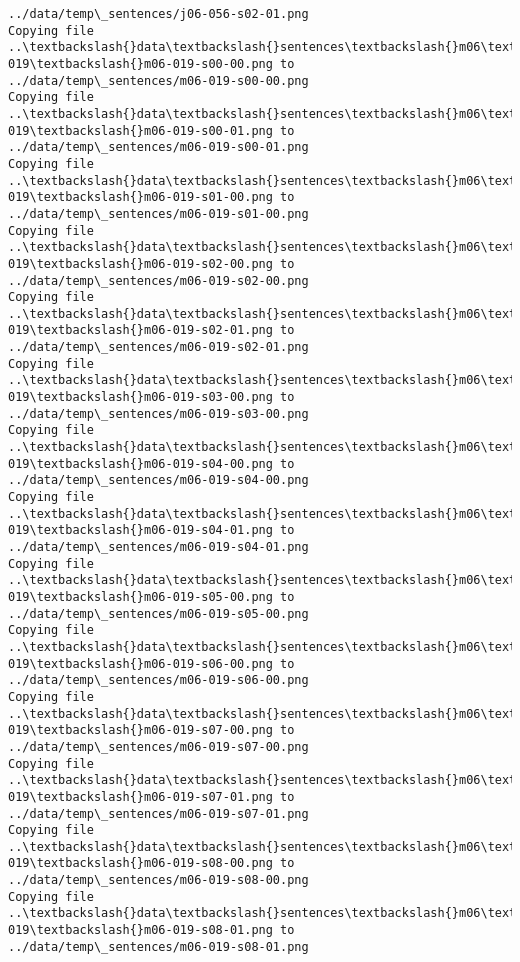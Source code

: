 \documentclass[11pt]{article}
\begin{document}
\begin{Verbatim}[commandchars=\\\{\}]
../data/temp\_sentences/j06-056-s02-01.png
Copying file ..\textbackslash{}data\textbackslash{}sentences\textbackslash{}m06\textbackslash{}m06-019\textbackslash{}m06-019-s00-00.png to
../data/temp\_sentences/m06-019-s00-00.png
Copying file ..\textbackslash{}data\textbackslash{}sentences\textbackslash{}m06\textbackslash{}m06-019\textbackslash{}m06-019-s00-01.png to
../data/temp\_sentences/m06-019-s00-01.png
Copying file ..\textbackslash{}data\textbackslash{}sentences\textbackslash{}m06\textbackslash{}m06-019\textbackslash{}m06-019-s01-00.png to
../data/temp\_sentences/m06-019-s01-00.png
Copying file ..\textbackslash{}data\textbackslash{}sentences\textbackslash{}m06\textbackslash{}m06-019\textbackslash{}m06-019-s02-00.png to
../data/temp\_sentences/m06-019-s02-00.png
Copying file ..\textbackslash{}data\textbackslash{}sentences\textbackslash{}m06\textbackslash{}m06-019\textbackslash{}m06-019-s02-01.png to
../data/temp\_sentences/m06-019-s02-01.png
Copying file ..\textbackslash{}data\textbackslash{}sentences\textbackslash{}m06\textbackslash{}m06-019\textbackslash{}m06-019-s03-00.png to
../data/temp\_sentences/m06-019-s03-00.png
Copying file ..\textbackslash{}data\textbackslash{}sentences\textbackslash{}m06\textbackslash{}m06-019\textbackslash{}m06-019-s04-00.png to
../data/temp\_sentences/m06-019-s04-00.png
Copying file ..\textbackslash{}data\textbackslash{}sentences\textbackslash{}m06\textbackslash{}m06-019\textbackslash{}m06-019-s04-01.png to
../data/temp\_sentences/m06-019-s04-01.png
Copying file ..\textbackslash{}data\textbackslash{}sentences\textbackslash{}m06\textbackslash{}m06-019\textbackslash{}m06-019-s05-00.png to
../data/temp\_sentences/m06-019-s05-00.png
Copying file ..\textbackslash{}data\textbackslash{}sentences\textbackslash{}m06\textbackslash{}m06-019\textbackslash{}m06-019-s06-00.png to
../data/temp\_sentences/m06-019-s06-00.png
Copying file ..\textbackslash{}data\textbackslash{}sentences\textbackslash{}m06\textbackslash{}m06-019\textbackslash{}m06-019-s07-00.png to
../data/temp\_sentences/m06-019-s07-00.png
Copying file ..\textbackslash{}data\textbackslash{}sentences\textbackslash{}m06\textbackslash{}m06-019\textbackslash{}m06-019-s07-01.png to
../data/temp\_sentences/m06-019-s07-01.png
Copying file ..\textbackslash{}data\textbackslash{}sentences\textbackslash{}m06\textbackslash{}m06-019\textbackslash{}m06-019-s08-00.png to
../data/temp\_sentences/m06-019-s08-00.png
Copying file ..\textbackslash{}data\textbackslash{}sentences\textbackslash{}m06\textbackslash{}m06-019\textbackslash{}m06-019-s08-01.png to
../data/temp\_sentences/m06-019-s08-01.png

\end{Verbatim}
\end{document}
